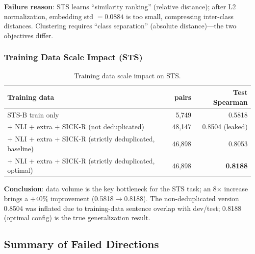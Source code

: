 \documentclass[11pt]{article}
\begin{document}
\textbf{Failure reason}: STS learns ``similarity ranking'' (relative
distance); after L2 normalization, embedding std $= 0.0884$ is too small,
compressing inter-class distances. Clustering requires ``class separation''
(absolute distance)---the two objectives differ.

\subsubsection{Training Data Scale Impact (STS)}

\begin{table}[h]
\centering
\begin{tabular}{lrr}
\toprule
Training data & pairs & Test Spearman \\
\midrule
STS-B train only & 5,749 & 0.5818 \\
+ NLI + extra + SICK-R (not deduplicated) & 48,147 & 0.8504 (leaked) \\
+ NLI + extra + SICK-R (strictly deduplicated, baseline) & 46,898 & 0.8053 \\
+ NLI + extra + SICK-R (strictly deduplicated, optimal) & 46,898 &
\textbf{0.8188} \\
\bottomrule
\end{tabular}
\caption{Training data scale impact on STS.}
\end{table}

\textbf{Conclusion}: data volume is the key bottleneck for the STS task; an
8$\times$ increase brings a $+40\%$ improvement (0.5818$\to$0.8188). The
non-deduplicated version 0.8504 was inflated due to training-data sentence
overlap with dev/test; 0.8188 (optimal config) is the true generalization
result.

\subsection{Summary of Failed Directions}
\end{document}
